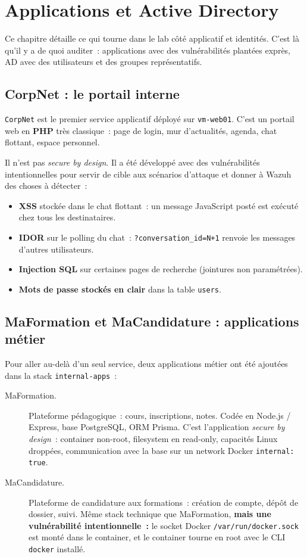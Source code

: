 \chapter{Applications et Active Directory}
\label{ch:apps-ad}

Ce chapitre détaille ce qui tourne dans le lab côté applicatif et
identités. C'est là qu'il y a de quoi auditer~: applications avec
des vulnérabilités plantées exprès, AD avec des utilisateurs et
des groupes représentatifs.

\section{CorpNet : le portail interne}

\texttt{CorpNet} est le premier service applicatif déployé sur
\texttt{vm-web01}. C'est un portail web en \textbf{PHP} très
classique~: page de login, mur d'actualités, agenda, chat
flottant, espace personnel.

Il n'est pas \emph{secure by design}. Il a été développé avec des
vulnérabilités intentionnelles pour servir de cible aux scénarios
d'attaque et donner à Wazuh des choses à détecter~:

\begin{itemize}
  \item \textbf{XSS} stockée dans le chat flottant~: un message
    JavaScript posté est exécuté chez tous les destinataires.
  \item \textbf{IDOR} sur le polling du chat~:
    \texttt{?conversation\_id=N+1} renvoie les messages d'autres
    utilisateurs.
  \item \textbf{Injection SQL} sur certaines pages de recherche
    (jointures non paramétrées).
  \item \textbf{Mots de passe stockés en clair} dans la table
    \texttt{users}.
\end{itemize}

\section{MaFormation et MaCandidature : applications métier}

Pour aller au-delà d'un seul service, deux applications métier
ont été ajoutées dans la stack \texttt{internal-apps}~:

\begin{description}
  \item[MaFormation.] Plateforme pédagogique~: cours, inscriptions,
    notes. Codée en Node.js / Express, base PostgreSQL, ORM
    Prisma. C'est l'application \emph{secure by design}~:
    container non-root, filesystem en read-only, capacités
    Linux droppées, communication avec la base sur un network
    Docker \texttt{internal: true}.
  \item[MaCandidature.] Plateforme de candidature aux formations~:
    création de compte, dépôt de dossier, suivi. Même stack
    technique que MaFormation, \textbf{mais une vulnérabilité
    intentionnelle~:} le socket Docker \texttt{/var/run/docker.sock}
    est monté dans le container, et le container tourne en root
    avec le CLI \texttt{docker} installé.
\end{description}

